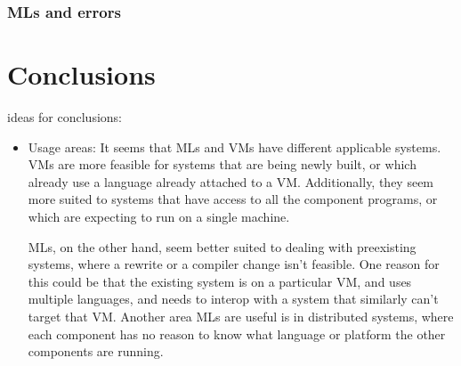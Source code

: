 \documentclass{sig-alternate}
\begin{document}
\subsubsection*{MLs and errors}



\section{Conclusions}
ideas for conclusions:

\begin{itemize}
\item Usage areas: It seems that MLs and VMs have different applicable systems. VMs are more feasible for systems that are being newly built, or which already use a language already attached to a VM. Additionally, they seem more suited to systems that have access to all the component programs, or which are expecting to run on a single machine.

MLs, on the other hand, seem better suited to dealing with preexisting systems, where a rewrite or a compiler change isn't feasible. One reason for this could be that the existing system is on a particular VM, and uses multiple languages, and needs to interop with a system that similarly can't target that VM. Another area MLs are useful is in distributed systems, where each component has no reason to know what language or platform the other components are running.

\end{itemize}





  
\end{document}
